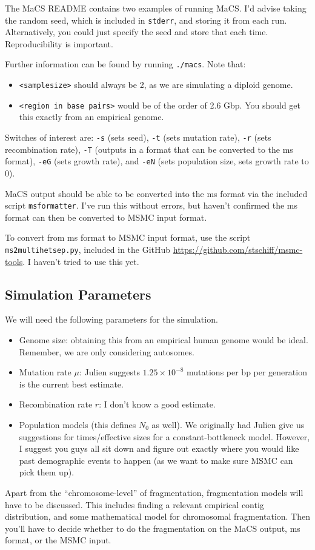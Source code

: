 \documentclass[11pt,a4paper]{article}
\begin{document}
The MaCS README contains two examples of running MaCS. I'd advise taking the random seed, which is included in \texttt{stderr}, and storing it from each run. Alternatively, you could just specify the seed and store that each time. Reproducibility is important.

Further information can be found by running \texttt{./macs}. Note that:
\begin{itemize}
\item \texttt{<samplesize>} should always be 2, as we are simulating a diploid genome.
\item \texttt{<region in base pairs>} would be of the order of 2.6 Gbp. You should get this exactly from an empirical genome.
\end{itemize}
Switches of interest are: \texttt{-s} (sets seed), \texttt{-t} (sets mutation rate), \texttt{-r} (sets recombination rate), \texttt{-T} (outputs in a format that can be converted to the ms format), \texttt{-eG} (sets growth rate), and \texttt{-eN} (sets population size, sets growth rate to 0).

MaCS output should be able to be converted into the ms format via the included script \texttt{msformatter}. I've run this without errors, but haven't confirmed the ms format can then be converted to MSMC input format.

To convert from ms format to MSMC input format, use the script \texttt{ms2multihetsep.py}, included in the GitHub \url{https://github.com/stschiff/msmc-tools}. I haven't tried to use this yet.

\subsection{Simulation Parameters}
We will need the following parameters for the simulation.
\begin{itemize}
\item Genome size: obtaining this from an empirical human genome would be ideal. Remember, we are only considering autosomes.
\item Mutation rate $\mu$: Julien suggests $1.25\times 10^{-8}$ mutations per bp per generation is the current best estimate. 
\item Recombination rate $r$: I don't know a good estimate.
\item Population models (this defines $N_0$ as well). We originally had Julien give us suggestions for times/effective sizes for a constant-bottleneck model. However, I suggest you guys all sit down and figure out exactly where you would like past demographic events to happen (as we want to make sure MSMC can pick them up).
\end{itemize}
Apart from the ``chromosome-level'' of fragmentation, fragmentation models will have to be discussed. This includes finding a relevant empirical contig distribution, and some mathematical model for chromosomal fragmentation. Then you'll have to decide whether to do the fragmentation on the MaCS output, ms format, or the MSMC input.
\end{document}
